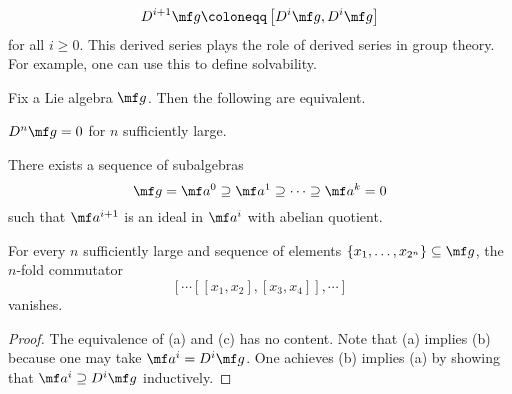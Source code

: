 \documentclass[../notes.tex]{subfiles}
\begin{document}
\[D^{i+1}\mf g\coloneqq\left[D^i\mf g,D^i\mf g\right]\]
for all $i\ge0$. This derived series plays the role of derived series in group theory. For example, one can use this to define solvability.
\begin{proposition}
	Fix a Lie algebra $\mf g$. Then the following are equivalent.
	\begin{listalph}
		\item $D^n\mf g=0$ for $n$ sufficiently large.
		\item There exists a sequence of subalgebras
		\[\mf g=\mf a^0\supseteq\mf a^1\supseteq\cdots\supseteq\mf a^k=0\]
		such that $\mf a^{i+1}$ is an ideal in $\mf a^i$ with abelian quotient.
		\item For every $n$ sufficiently large and sequence of elements $\{x_1,\ldots,x_{2^n}\}\subseteq\mf g$, the $n$-fold commutator
		\[[\cdots[[x_1,x_2],[x_3,x_4]],\cdots]\]
		vanishes.
	\end{listalph}
\end{proposition}
\begin{proof}
	The equivalence of (a) and (c) has no content. Note that (a) implies (b) because one may take $\mf a^i=D^i\mf g$. One achieves (b) implies (a) by showing that $\mf a^i\supseteq D^i\mf g$ inductively.
\end{proof}
\end{document}
